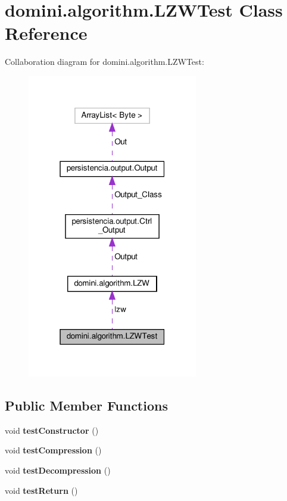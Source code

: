 \hypertarget{classdomini_1_1algorithm_1_1LZWTest}{}\section{domini.\+algorithm.\+L\+Z\+W\+Test Class Reference}
\label{classdomini_1_1algorithm_1_1LZWTest}


Collaboration diagram for domini.\+algorithm.\+L\+Z\+W\+Test\+:
\nopagebreak
\begin{figure}[H]
\begin{center}
\leavevmode
\includegraphics[width=211pt]{classdomini_1_1algorithm_1_1LZWTest__coll__graph}
\end{center}
\end{figure}
\subsection*{Public Member Functions}
\begin{DoxyCompactItemize}
\item 
\mbox{\label{classdomini_1_1algorithm_1_1LZWTest_a7c9c06d11571cf8ebcaff5404c920e30}} 
void {\bfseries test\+Constructor} ()
\item 
\mbox{\label{classdomini_1_1algorithm_1_1LZWTest_a83d521e2900616a43a01e02fc54e6e02}} 
void {\bfseries test\+Compression} ()
\item 
\mbox{\label{classdomini_1_1algorithm_1_1LZWTest_abec7c3f2f555e72270904c5fba516fc9}} 
void {\bfseries test\+Decompression} ()
\item 
\mbox{\label{classdomini_1_1algorithm_1_1LZWTest_a9c12c40702a978985f84dc7feece791e}} 
void {\bfseries test\+Return} ()
\end{DoxyCompactItemize}
